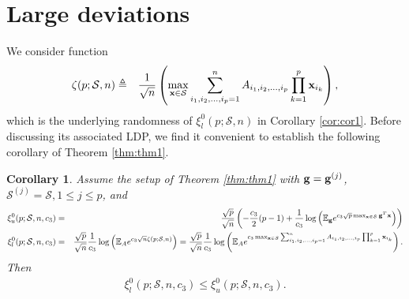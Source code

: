 \documentclass[10pt]{article}
\def\x{{\bf x}}
\def\x{{\mathbf x}}
\def\x{{\bf x}}
\def\x{{\bf x}}
\def\g{{\bf g}}
\def\mE{{\mathbb E}}
\def\lp{\left (}
\def\rp{\right )}
\def\x{{\bf x}}
\def\x{{\mathbf x}}
\def\x{{\bf x}}
\def\x{{\bf x}}
\def\g{{\bf g}}
\def\cS{{\mathcal S}}
\newtheorem{corollary}{Corollary}
\begin{document}
\section{Large deviations}
\label{sec:ldp}



We consider function
 \begin{eqnarray}
 \label{eq:ldpeq1}
   \zeta (p;\cS,n) & \triangleq & \frac{1}{\sqrt{ n}}\lp \max_{\x\in\cS} \sum_{i_1,i_2,\dots,i_p=1}^n A_{i_1,i_2,\dots,i_p}\prod_{k=1}^{p}\x_{i_k}
 \rp,
  \end{eqnarray}
which is the  underlying randomness of $\xi_l^0(p;\cS,n) $ in Corollary \ref{cor:cor1}. Before discussing its associated LDP, we find it convenient to establish the following corollary of Theorem \ref{thm:thm1}.

\begin{corollary}
\label{cor:cor2}
Assume the setup of Theorem \ref{thm:thm1} with $\g=\g^{(j)}$, $\cS^{(j)}=\cS,1\leq j\leq p$, and
 \begin{eqnarray}
   \label{eq:cor2eq1}
 \xi_u^0(p;\cS,n,c_3) & = & \frac{\sqrt{p}}{\sqrt{n}} \lp -\frac{c_{3}}{2}(p-1)  + \frac{1}{c_{3}} \log\lp  \mE_{\g} e^{c_{3}\sqrt{p}\max_{\x\in\cS} \g^T\x } \rp \rp
\nonumber \\
\xi_l^0(p;\cS,n,c_3) & = &  \frac{\sqrt{p}}{\sqrt{n}} \frac{1}{c_{3}} \log \lp \mE_{A} e^{ c_{3}  \sqrt{n}     \zeta (p;\cS,n)  } \rp  =  \frac{\sqrt{p}}{\sqrt{n}} \frac{1}{c_{3}} \log \lp \mE_{A} e^{ c_{3} \max_{\x\in\cS }  \sum_{i_1,i_2,\dots,i_p=1}^n A_{i_1,i_2,\dots,i_p}\prod_{k=1}^{p}\x_{i_k}
 } \rp.\nonumber \\
 \end{eqnarray}
Then
\begin{eqnarray}
   \label{eq:cor2eq2}
\xi^0_l(p;\cS,n,c_{3})  \leq  \xi^0_u(p;\cS,n,c_{3}).
\end{eqnarray}
\end{corollary}
\end{document}
